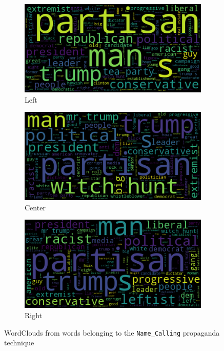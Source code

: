 \begin{figure}[!htb]
     \centering
     \begin{subfigure}[b]{0.3\textwidth}
         \centering
         \includegraphics[width=\textwidth]{figures/baly_wordclouds_Name_Calling,Labeling_Left.png}
         \caption{Left}
         \label{fig:wc_loaded_left}
     \end{subfigure}
     \hfill
     \begin{subfigure}[b]{0.3\textwidth}
         \centering
         \includegraphics[width=\textwidth]{figures/baly_wordclouds_Name_Calling,Labeling_Center.png}
         \caption{Center}
         \label{fig:wc_loaded_center}
     \end{subfigure}
     \hfill
     \begin{subfigure}[b]{0.3\textwidth}
         \centering
         \includegraphics[width=\textwidth]{figures/baly_wordclouds_Name_Calling,Labeling_Right.png}
         \caption{Right}
         \label{fig:wc_loaded_right}
     \end{subfigure}
        \caption{WordClouds from words belonging to the \texttt{Name\_Calling} propaganda technique}
        \label{fig:wc_name_calling}
\end{figure}


